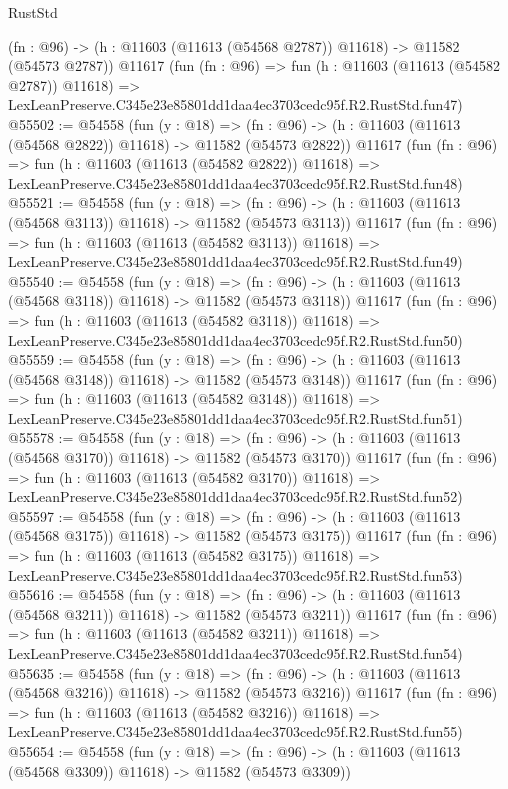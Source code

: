 \begin{lexlean}{RustStd}
\begin{coremodule}
    (fn : @96) -> (h : @11603 (@11613 (@54568 @2787)) @11618) -> @11582 (@54573 @2787))
    @11617
    (fun (fn : @96) =>
    fun (h : @11603 (@11613 (@54582 @2787)) @11618) =>
    LexLeanPreserve.C345e23e85801dd1daa4ec3703cedc95f.R2.RustStd.fun47)
@55502 := @54558
    (fun (y : @18) =>
    (fn : @96) -> (h : @11603 (@11613 (@54568 @2822)) @11618) -> @11582 (@54573 @2822))
    @11617
    (fun (fn : @96) =>
    fun (h : @11603 (@11613 (@54582 @2822)) @11618) =>
    LexLeanPreserve.C345e23e85801dd1daa4ec3703cedc95f.R2.RustStd.fun48)
@55521 := @54558
    (fun (y : @18) =>
    (fn : @96) -> (h : @11603 (@11613 (@54568 @3113)) @11618) -> @11582 (@54573 @3113))
    @11617
    (fun (fn : @96) =>
    fun (h : @11603 (@11613 (@54582 @3113)) @11618) =>
    LexLeanPreserve.C345e23e85801dd1daa4ec3703cedc95f.R2.RustStd.fun49)
@55540 := @54558
    (fun (y : @18) =>
    (fn : @96) -> (h : @11603 (@11613 (@54568 @3118)) @11618) -> @11582 (@54573 @3118))
    @11617
    (fun (fn : @96) =>
    fun (h : @11603 (@11613 (@54582 @3118)) @11618) =>
    LexLeanPreserve.C345e23e85801dd1daa4ec3703cedc95f.R2.RustStd.fun50)
@55559 := @54558
    (fun (y : @18) =>
    (fn : @96) -> (h : @11603 (@11613 (@54568 @3148)) @11618) -> @11582 (@54573 @3148))
    @11617
    (fun (fn : @96) =>
    fun (h : @11603 (@11613 (@54582 @3148)) @11618) =>
    LexLeanPreserve.C345e23e85801dd1daa4ec3703cedc95f.R2.RustStd.fun51)
@55578 := @54558
    (fun (y : @18) =>
    (fn : @96) -> (h : @11603 (@11613 (@54568 @3170)) @11618) -> @11582 (@54573 @3170))
    @11617
    (fun (fn : @96) =>
    fun (h : @11603 (@11613 (@54582 @3170)) @11618) =>
    LexLeanPreserve.C345e23e85801dd1daa4ec3703cedc95f.R2.RustStd.fun52)
@55597 := @54558
    (fun (y : @18) =>
    (fn : @96) -> (h : @11603 (@11613 (@54568 @3175)) @11618) -> @11582 (@54573 @3175))
    @11617
    (fun (fn : @96) =>
    fun (h : @11603 (@11613 (@54582 @3175)) @11618) =>
    LexLeanPreserve.C345e23e85801dd1daa4ec3703cedc95f.R2.RustStd.fun53)
@55616 := @54558
    (fun (y : @18) =>
    (fn : @96) -> (h : @11603 (@11613 (@54568 @3211)) @11618) -> @11582 (@54573 @3211))
    @11617
    (fun (fn : @96) =>
    fun (h : @11603 (@11613 (@54582 @3211)) @11618) =>
    LexLeanPreserve.C345e23e85801dd1daa4ec3703cedc95f.R2.RustStd.fun54)
@55635 := @54558
    (fun (y : @18) =>
    (fn : @96) -> (h : @11603 (@11613 (@54568 @3216)) @11618) -> @11582 (@54573 @3216))
    @11617
    (fun (fn : @96) =>
    fun (h : @11603 (@11613 (@54582 @3216)) @11618) =>
    LexLeanPreserve.C345e23e85801dd1daa4ec3703cedc95f.R2.RustStd.fun55)
@55654 := @54558
    (fun (y : @18) =>
    (fn : @96) -> (h : @11603 (@11613 (@54568 @3309)) @11618) -> @11582 (@54573 @3309))

\end{coremodule}
\end{lexlean}
